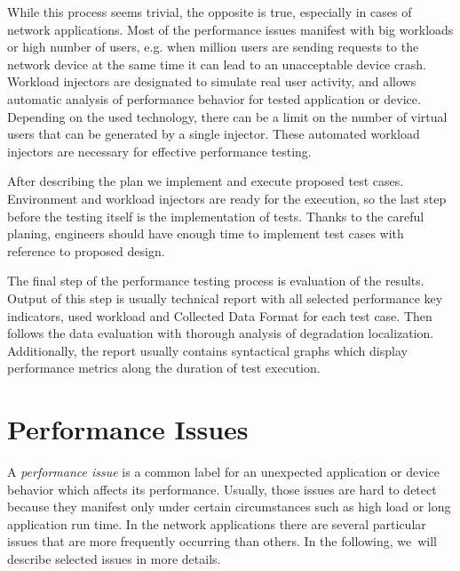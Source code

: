 While this process seems trivial, the opposite is true, especially in cases of network applications. Most of the performance issues manifest with big workloads or high number of users, e.g. when million users are sending requests to the network device at the same time it can lead to an unacceptable device crash. Workload injectors are designated to simulate real user activity, and allows automatic analysis of performance behavior for tested application or device. Depending on the used technology, there can be a limit on the number of virtual users that can be generated by a single injector. These automated workload injectors are necessary for effective performance testing.

After describing the plan we implement and execute proposed test cases. Environment and workload injectors are ready for the execution, so the last step before the testing itself is the implementation of tests. Thanks to the careful planing, engineers should have enough time to implement test cases with reference to proposed design.

The final step of the performance testing process is evaluation of the results. Output of this step is usually technical report with all selected performance key indicators, used workload and Collected Data Format for each test case. Then follows the data evaluation with thorough analysis of degradation localization. Additionally, the report usually contains syntactical graphs which display performance metrics along the duration of test execution.

\section{Performance Issues}
\label{Performance Issues}
A \emph{performance issue} is a common label for an unexpected application or device behavior which affects its performance. Usually, those issues are hard to detect because they manifest only under certain circumstances such as high load or long application run time. In the network applications there are several particular issues that are more frequently occurring  than others. In the following, we~will describe selected issues in more details.

